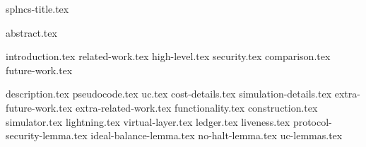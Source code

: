 \documentclass{llncs}
\begin{document}
\pagestyle{plain}
{splncs-title.tex}
\maketitle
{abstract.tex}



{introduction.tex}
{related-work.tex}
{high-level.tex}
{security.tex}
{comparison.tex}
{future-work.tex}

\newpage
\makeatletter%
%
  {\appendices}%
  {\appendix}%
\makeatother%
{description.tex}
{pseudocode.tex}
{uc.tex}
{cost-details.tex}
{simulation-details.tex}
{extra-future-work.tex}
{extra-related-work.tex}
{functionality.tex}
{construction.tex}
{simulator.tex}
{lightning.tex}
{virtual-layer.tex}
{ledger.tex}
{liveness.tex}
{protocol-security-lemma.tex}
{ideal-balance-lemma.tex}
{no-halt-lemma.tex}
{uc-lemmas.tex}
\end{document}
